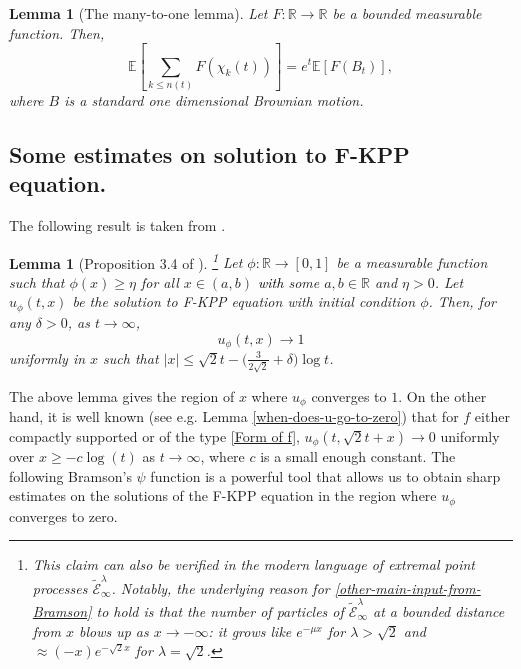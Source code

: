 \documentclass[a4paper,reqno]{amsart}%
\newcommand{\1}{\mathbf 1}
\theoremstyle{mine}
\numberwithin{theorem}{section}
\newtheorem{lemma}[theorem]{Lemma}
\numberwithin{equation}{section}
\theoremstyle{remark}
\begin{document}
\begin{lemma}[The many-to-one lemma]\label{Lemma many to one}
Let $F: \mathbb R \to \mathbb R$ be a bounded measurable function. Then, 
    \begin{equation}
        \mathbb E[\sum_{k \le n(t)} F(\chi_k(t))]=e^t \mathbb E[F(B_t)],
    \end{equation}
    where $B$ is a standard one dimensional Brownian motion.
\end{lemma}




\subsection{Some estimates on solution to F-KPP equation.}






The following result is taken from \cite{Bramson83}.

\begin{lemma}[Proposition 3.4 of \cite{Bramson83}]\label{Bramson-converges-to-1}\footnote{This claim can also be verified in the modern language of extremal point processes $\widetilde{\mathcal{E}}_\infty^\lambda$. Notably, the underlying reason for \eqref{other-main-input-from-Bramson} to hold is that the number of particles of $\widetilde{\mathcal{E}}_\infty^\lambda$ at a bounded distance from $x$ blows up as $x\to -\infty$: it grows like $ e^{-\mu x}$ for $\lambda >\sqrt{2}$ and $\approx (-x)e^{-\sqrt{2}x}$ for $\lambda = \sqrt{2}$.}
    Let $\phi:\mathbb{R}\to [0,1]$ be a measurable function such that $\phi(x) \geq \eta$ for all $x\in (a,b)$ \textcolor{black}{with} some $a,b \in \mathbb{R}$ and $\eta >0$. Let $u_\phi(t,x)$ be the solution to F-KPP equation with initial condition $\phi$. Then, for any $\delta >0$, as $t \to \infty$,
\begin{equation}\label{other-main-input-from-Bramson}
u_\phi\left(t, x\right) \to 1
\end{equation}
uniformly in $x$ such that $|x| \le \sqrt{2}t - \bigl(\frac{3}{2\sqrt{2}} + \delta\bigr)\log t$.
\end{lemma}



The above lemma gives the region of $x$ where $u_\phi$ converges to $1$. On the other hand, it is well known (see e.g. Lemma \ref{when-does-u-go-to-zero}) that for $f$ either compactly supported or of the type \eqref{Form of f}, $u_\phi(t, \sqrt{2}t + x) \to 0$ uniformly over $x\geq - c \log (t)$ as $t \to \infty$, where $c$ is a small enough constant. The following Bramson's $\psi$ function is a powerful tool that allows us to obtain sharp estimates on the solutions of the F-KPP equation in the region where $u_\phi$ converges to zero. 
\end{document}
